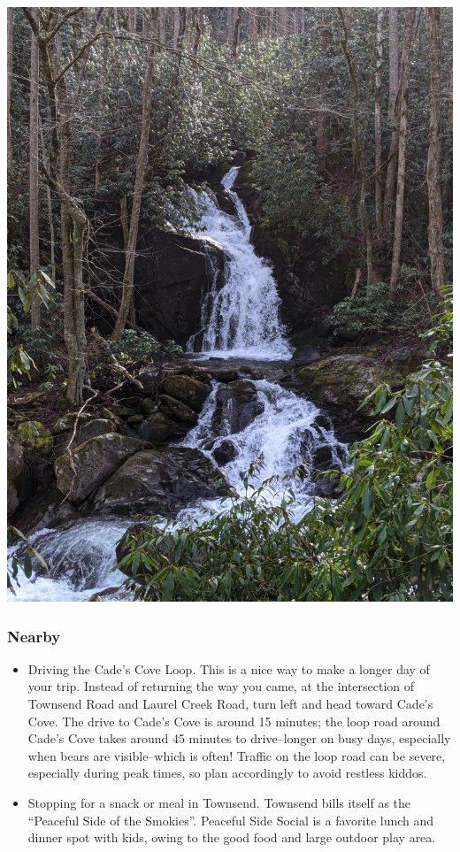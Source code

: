 \documentclass[
  letterpaper,
  DIV=11,
  numbers=noendperiod]{scrartcl}
\providecommand{\tightlist}{%
  \setlength{\itemsep}{0pt}\setlength{\parskip}{0pt}}\usepackage{longtable,booktabs,array}
\begin{document}
\includegraphics{img/trail-22-figure-01.jpg}

\hypertarget{nearby-23}{%
\subsubsection{Nearby}\label{nearby-23}}

\begin{itemize}
\tightlist
\item
  Driving the Cade's Cove Loop. This is a nice way to make a longer day
  of your trip. Instead of returning the way you came, at the
  intersection of Townsend Road and Laurel Creek Road, turn left and
  head toward Cade's Cove. The drive to Cade's Cove is around 15
  minutes; the loop road around Cade's Cove takes around 45 minutes to
  drive--longer on busy days, especially when bears are visible--which
  is often! Traffic on the loop road can be severe, especially during
  peak times, so plan accordingly to avoid restless kiddos.
\item
  Stopping for a snack or meal in Townsend. Townsend bills itself as the
  ``Peaceful Side of the Smokies''. Peaceful Side Social is a favorite
  lunch and dinner spot with kids, owing to the good food and large
  outdoor play area.
\end{itemize}
\end{document}
